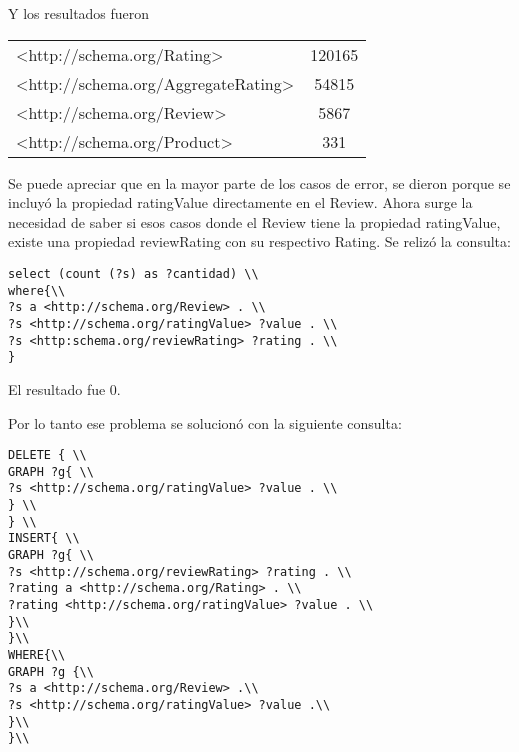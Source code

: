 Y los resultados fueron

\begin{tabular}{| l | c |}
 <http://schema.org/Rating> & 120165\\
 <http://schema.org/AggregateRating> & 54815 \\
 <http://schema.org/Review> & 5867 \\
 <http://schema.org/Product> & 331 \\
\end{tabular}

Se puede apreciar que en la mayor parte de los casos de error, se dieron porque se incluyó la propiedad ratingValue directamente en 
el Review. Ahora surge la necesidad de saber si esos casos donde el Review tiene la propiedad ratingValue, existe una propiedad reviewRating 
con su respectivo Rating.
Se relizó la consulta:

\begin{lstlisting}[frame=single]  
select (count (?s) as ?cantidad) \\
where{\\
?s a <http://schema.org/Review> . \\
?s <http://schema.org/ratingValue> ?value . \\
?s <http:schema.org/reviewRating> ?rating . \\
}
\end{lstlisting}

El resultado fue 0.

Por lo tanto ese problema se solucionó con la siguiente consulta:

\begin{lstlisting}[frame=single]  
DELETE { \\
GRAPH ?g{ \\
?s <http://schema.org/ratingValue> ?value . \\
} \\
} \\
INSERT{ \\
GRAPH ?g{ \\
?s <http://schema.org/reviewRating> ?rating . \\
?rating a <http://schema.org/Rating> . \\
?rating <http://schema.org/ratingValue> ?value . \\
}\\
}\\
WHERE{\\
GRAPH ?g {\\
?s a <http://schema.org/Review> .\\
?s <http://schema.org/ratingValue> ?value .\\
}\\
}\\
\end{lstlisting}

